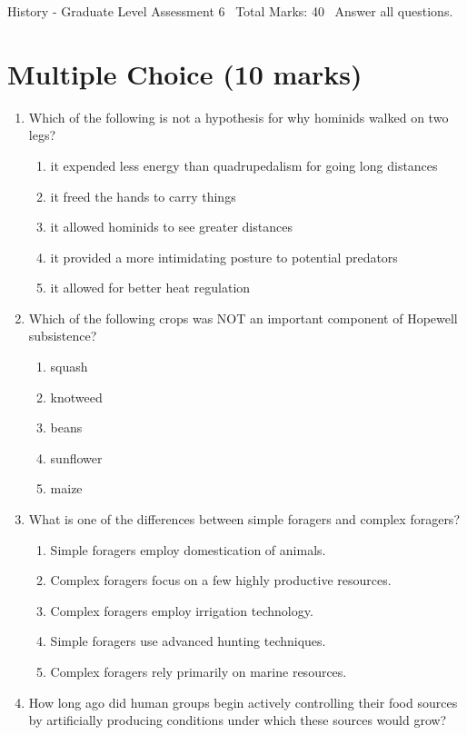 \documentclass[12pt]{article}
\begin{document}
\begin{center}
History - Graduate Level Assessment 6 \
Total Marks: 40 \
Answer all questions.
\end{center}

\section*{Multiple Choice (10 marks)}
\begin{enumerate}[label=\arabic*.]
\item Which of the following is not a hypothesis for why hominids walked on two legs?
\begin{enumerate}[label=(\alph*)]
    \item it expended less energy than quadrupedalism for going long distances
    \item it freed the hands to carry things
    \item it allowed hominids to see greater distances
    \item it provided a more intimidating posture to potential predators
    \item it allowed for better heat regulation
\end{enumerate}
\item Which of the following crops was NOT an important component of Hopewell subsistence?
\begin{enumerate}[label=(\alph*)]
    \item squash
    \item knotweed
    \item beans
    \item sunflower
    \item maize
\end{enumerate}
\item What is one of the differences between simple foragers and complex foragers?
\begin{enumerate}[label=(\alph*)]
    \item Simple foragers employ domestication of animals.
    \item Complex foragers focus on a few highly productive resources.
    \item Complex foragers employ irrigation technology.
    \item Simple foragers use advanced hunting techniques.
    \item Complex foragers rely primarily on marine resources.
\end{enumerate}
\item How long ago did human groups begin actively controlling their food sources by artificially producing conditions under which these sources would grow?

\end{enumerate}
\end{document}
